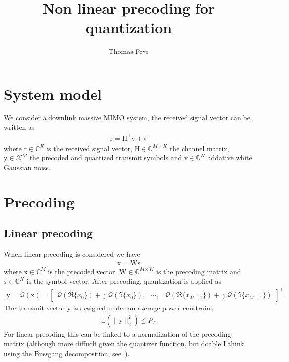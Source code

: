 \documentclass[12pt]{article}
\newcommand{\vect}[1]{\boldsymbol{\mathrm{#1}}}
\newcommand{\mat}[1]{\boldsymbol{\mathrm{#1}}}
\newcommand{\expt}[1]{\mathbb{E}\left(#1\right)}
\theoremstyle{remark}
\begin{document}
\title{Non linear precoding for quantization}
\author{Thomas Feys}
\maketitle
\large

\section{System model}
We consider a downlink massive MIMO system, the received signal vector can be written as 
\begin{align}
	\vect{r} = \mat{H}^{\intercal} \vect{y} + \vect{v}
\end{align}
where $\vect{r} \in \mathbb{C}^{K}$ is the received signal vector, $\mat{H}\in\mathbb{C}^{M\times K}$ the channel matrix, $\vect{y}\in\mathcal{X}^{M}$ the precoded and quantized transmit symbols and $\vect{v}\in\mathbb{C}^{K}$ addative white Gaussian noise.

\section{Precoding}
\subsection{Linear precoding}
When linear precoding is considered we have
\begin{align}
	\vect{x} = \mat{W} \vect{s}
\end{align}
where $\vect{x} \in \mathbb{C}^{M}$ is the precoded vector, $\mat{W} \in \mathbb{C}^{M\times K}$ is the precoding matrix and $\vect{s} \in \mathbb{C}^{K}$ is the symbol vector. After precoding, quantization is applied as 
\begin{align}
	\vect{y} = \mathcal{Q}(\vect{x}) = \begin{bmatrix} \mathcal{Q}(\Re\{x_0\}) + \jmath \mathcal{Q}(\Im\{x_0\}), & \cdots,  & \mathcal{Q}(\Re\{x_{M-1}\}) + \jmath \mathcal{Q}(\Im\{x_{M-1}\}) \end{bmatrix}^{\intercal}.
\end{align}
The transmit vector $\vect{y}$ is designed under an average power constraint 
\begin{align}
	\expt{\|\vect{y}\|_2^2} \leq P_T
\end{align}
For linear precoding this can be linked to a normalization of the precoding matrix (although more diffuclt given the quantizer function, but doable I think using the Bussgang decomposition, see~\cite{EE_Optimization}).
\end{document}
